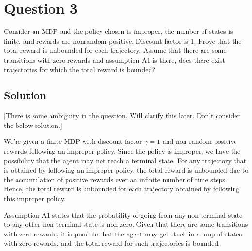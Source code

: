 \section*{Question 3}

Consider an MDP and the policy chosen is improper, the number of states is finite, and rewards are nonrandom positive.
Discount factor is 1.
Prove that the total reward is unbounded for each trajectory.
Assume that there are some transitions with zero rewards and assumption A1 is there, does there exist trajectories for which the total reward is bounded?

\subsection*{Solution}

[There is some ambiguity in the question.
    Will clarify this later.
    Don't consider the below solution.]

\vspace*{2em}

We're given a finite MDP with discount factor \( \gamma = 1 \) and non-random positive rewards following an improper policy.
Since the policy is improper, we have the possibility that the agent may not reach a terminal state.
For any trajectory that is obtained by following an improper policy, the total reward is unbounded due to the accumulation of positive rewards over an infinite number of time steps.
Hence, the total reward is unbounded for each trajectory obtained by following this improper policy.

Assumption-A1 states that the probability of going from any non-terminal state to any other non-terminal state is non-zero.
Given that there are some transitions with zero rewards, it is possible that the agent may get stuck in a loop of states with zero rewards, and the total reward for such trajectories is bounded.
